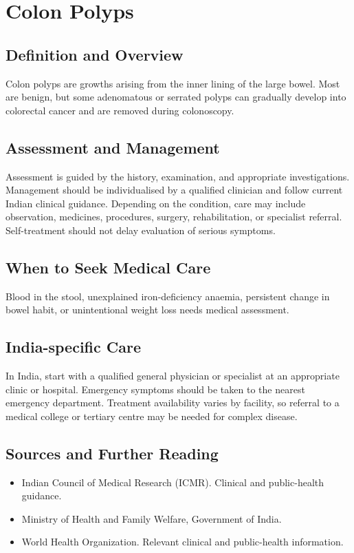 \chapter{Colon Polyps}

\section*{Definition and Overview}
Colon polyps are growths arising from the inner lining of the large bowel. Most are benign, but some adenomatous or serrated polyps can gradually develop into colorectal cancer and are removed during colonoscopy.

\section*{Assessment and Management}
Assessment is guided by the history, examination, and appropriate investigations. Management should be individualised by a qualified clinician and follow current Indian clinical guidance. Depending on the condition, care may include observation, medicines, procedures, surgery, rehabilitation, or specialist referral. Self-treatment should not delay evaluation of serious symptoms.

\section*{When to Seek Medical Care}
Blood in the stool, unexplained iron-deficiency anaemia, persistent change in bowel habit, or unintentional weight loss needs medical assessment.

\section*{India-specific Care}
In India, start with a qualified general physician or specialist at an appropriate clinic or hospital. Emergency symptoms should be taken to the nearest emergency department. Treatment availability varies by facility, so referral to a medical college or tertiary centre may be needed for complex disease.

\section*{Sources and Further Reading}
\begin{itemize}
    \item Indian Council of Medical Research (ICMR). Clinical and public-health guidance.
    \item Ministry of Health and Family Welfare, Government of India.
    \item World Health Organization. Relevant clinical and public-health information.
\end{itemize}

